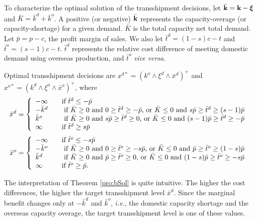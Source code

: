 \documentclass[mnsc,nonblindrev,copyedit]{informs2_wz} %
\newcommand{\proof}{\noindent{\bf Proof: } }
\newcommand{\qed}{ \hfill $\Box$ }
\newcommand{\xiv}{\mbox{\boldmath$\xi$}}
\begin{document}
To characterize the optimal solution of the transshipment decisions, let $\bar{\bold k} = \bold k - \xiv$ and $\bar{K} = \bar{k}^d+\bar{k}^o$.  A positive (or negative) $\bar{\bold k}$ represents the capacity-overage (or capacity-shortage) for a given demand.  $\bar{K}$ is the total capacity net total demand.  Let $\bar{p} = p-c$, the profit margin of sales.  We also let $\bar{t}^d = (1-s)c-t$ and $\bar{t}^o = (s-1)c-t$.  $\bar{t}^d$ represents the relative cost difference of meeting domestic demand using overseas production, and $\bar{t}^o$ {\it vice versa.}


{\theorem Optimal transshipment decisions are $x^{d*} = (k^o\wedge \xi^d \wedge \bar{x}^d)^+$ and $x^{o*} = (k^d\wedge \xi^o \wedge \bar{x}^o)^+$, where
\begin{eqnarray}
\bar{x}^d= \left\{
  \begin{array} {ll}
  -\infty  \quad & \mbox {if $\bar{t}^d \leq -\bar{p}$}\\
  -\bar{k}^d  \quad & \mbox{ if $\bar{K} \geq 0$ and $0 \geq \bar{t}^d
  \geq -\bar{p}$, or $\bar{K} \leq 0$ and $ s\bar{p} \geq
  \bar{t}^d \geq (s-1) \bar{p}$} \\
\bar{k}^o  \quad  & \mbox{ if $\bar{K} \geq 0$ and $s\bar{p} \geq
\bar{t}^d \geq 0$, or $\bar{K} \leq 0$ and $  (s-1) \bar{p}\geq
  \bar{t}^d \geq -\bar{p}$}\\
  \infty \quad &\mbox {if $\bar{t}^d \geq s\bar{p}$}
  \end{array} \right.
\end{eqnarray}
\begin{eqnarray} \bar{x}^o= \left\{
  \begin{array} {ll}
  -\infty \quad & \mbox {if $\bar{t}^o \leq -s\bar{p}$}\\
  -\bar{k}^o \quad & \mbox{ if $\bar{K} \geq 0$ and $0 \geq
  \bar{t}^o
  \geq -s\bar{p}$, or $\bar{K} \leq 0$ and $ \bar{p} \geq
  \bar{t}^o \geq (1-s) \bar{p}$} \\
\bar{k}^d  \quad  & \mbox{ if $\bar{K} \geq 0$ and $\bar{p} \geq
\bar{t}^o \geq 0$, or $\bar{K} \leq 0$ and $  (1-s) \bar{p}\geq
  \bar{t}^o \geq -s\bar{p}$}\\
  \infty \quad &\mbox {if $\bar{t}^o \geq \bar{p}$.}
  \end{array} \right.
\end{eqnarray}
\label{pro:bSol}}


The interpretation of Theorem \ref{pro:bSol} is quite intuitive.  The higher the cost differences, the higher the target transshipment level $\bar{x}^d$.  Since the marginal benefit changes only at $-\bar{k}^d$ and $\bar{k}^o$, {\it i.e.}, the domestic capacity shortage and the overseas capacity overage, the target transshipment level is one of these values.
\end{document}
